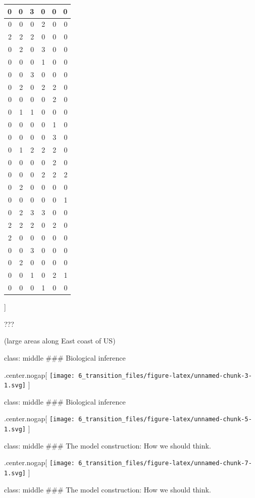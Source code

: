 \documentclass[
]{article}
\begin{document}
\begin{tabular}{r|r|r|r|r|r}
\hline
0 & 0 & 3 & 0 & 0 & 0\\
\hline
0 & 0 & 0 & 2 & 0 & 0\\
\hline
2 & 2 & 2 & 0 & 0 & 0\\
\hline
0 & 2 & 0 & 3 & 0 & 0\\
\hline
0 & 0 & 0 & 1 & 0 & 0\\
\hline
0 & 0 & 3 & 0 & 0 & 0\\
\hline
0 & 2 & 0 & 2 & 2 & 0\\
\hline
0 & 0 & 0 & 0 & 2 & 0\\
\hline
0 & 1 & 1 & 0 & 0 & 0\\
\hline
0 & 0 & 0 & 0 & 1 & 0\\
\hline
0 & 0 & 0 & 0 & 3 & 0\\
\hline
0 & 1 & 2 & 2 & 2 & 0\\
\hline
0 & 0 & 0 & 0 & 2 & 0\\
\hline
0 & 0 & 0 & 2 & 2 & 2\\
\hline
0 & 2 & 0 & 0 & 0 & 0\\
\hline
0 & 0 & 0 & 0 & 0 & 1\\
\hline
0 & 2 & 3 & 3 & 0 & 0\\
\hline
2 & 2 & 2 & 0 & 2 & 0\\
\hline
2 & 0 & 0 & 0 & 0 & 0\\
\hline
0 & 0 & 3 & 0 & 0 & 0\\
\hline
0 & 2 & 0 & 0 & 0 & 0\\
\hline
0 & 0 & 1 & 0 & 2 & 1\\
\hline
0 & 0 & 0 & 1 & 0 & 0\\
\hline
\end{tabular}

{]}

???

(large areas along East coast of US)

class: middle \#\#\# Biological inference

.center.nogap{[}
\texttt{[image: 6\_transition\_files/figure-latex/unnamed-chunk-3-1.svg]}
{]}

class: middle \#\#\# Biological inference

.center.nogap{[}
\texttt{[image: 6\_transition\_files/figure-latex/unnamed-chunk-5-1.svg]}
{]}

class: middle \#\#\# The model construction: How we should think.

.center.nogap{[}
\texttt{[image: 6\_transition\_files/figure-latex/unnamed-chunk-7-1.svg]}
{]}

class: middle \#\#\# The model construction: How we should think.
\end{document}
